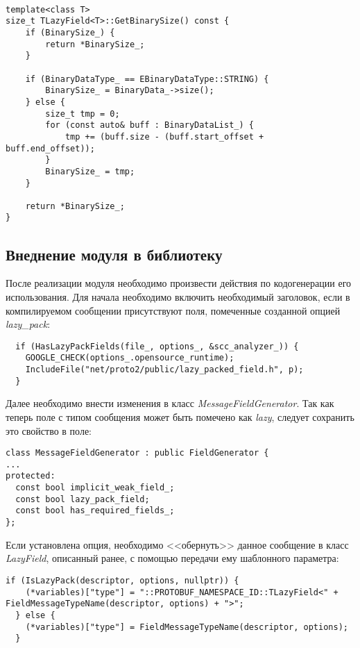 \begin{lstlisting}[style=CodeListing]

template<class T>
size_t TLazyField<T>::GetBinarySize() const {
    if (BinarySize_) {
        return *BinarySize_;
    }

    if (BinaryDataType_ == EBinaryDataType::STRING) {
        BinarySize_ = BinaryData_->size();
    } else {
        size_t tmp = 0;
        for (const auto& buff : BinaryDataList_) {
            tmp += (buff.size - (buff.start_offset + buff.end_offset));
        }
        BinarySize_ = tmp;
    }

    return *BinarySize_;
}
\end{lstlisting}

\subsection{Внеднение модуля в библиотеку}

После реализации модуля необходимо произвести действия по кодогенерации его использования.
Для начала необходимо включить необходимый заголовок, если в компилируемом сообщении присутствуют поля, помеченные созданной опцией \textit{lazy\_pack}:

\begin{lstlisting}
  if (HasLazyPackFields(file_, options_, &scc_analyzer_)) {
    GOOGLE_CHECK(options_.opensource_runtime);
    IncludeFile("net/proto2/public/lazy_packed_field.h", p);
  }
\end{lstlisting}

Далее необходимо внести изменения в класс \textit{MessageFieldGenerator}. Так как теперь поле с типом сообщения может быть помечено как \textit{lazy}, следует сохранить это свойство в поле:

\begin{lstlisting}[style=CodeListing]
class MessageFieldGenerator : public FieldGenerator {
...
protected:
  const bool implicit_weak_field_;
  const bool lazy_pack_field;
  const bool has_required_fields_;
};
\end{lstlisting}

Если установлена опция, необходимо <<обернуть>> данное сообщение в класс \textit{LazyField}, описанный ранее, с помощью передачи ему шаблонного параметра:

\begin{lstlisting}[style=CodeListing]
  if (IsLazyPack(descriptor, options, nullptr)) {
    (*variables)["type"] = "::PROTOBUF_NAMESPACE_ID::TLazyField<" + FieldMessageTypeName(descriptor, options) + ">";
  } else {
    (*variables)["type"] = FieldMessageTypeName(descriptor, options);
  }
\end{lstlisting}

